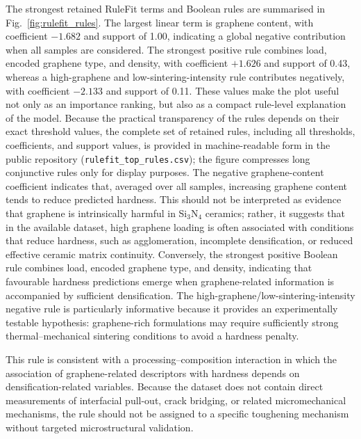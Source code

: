 \documentclass[pdflatex,sn-mathphys-num]{sn-jnl}%
\theoremstyle{thmstyleone}%
\theoremstyle{thmstyletwo}%
\theoremstyle{thmstylethree}%
\begin{document}
The strongest retained RuleFit terms and Boolean rules are summarised in Fig.~\ref{fig:rulefit_rules}. The largest linear term is graphene content, with coefficient $-1.682$ and support of 1.00, indicating a global negative contribution when all samples are considered. The strongest positive rule combines load, encoded graphene type, and density, with coefficient $+1.626$ and support of 0.43, whereas a high-graphene and low-sintering-intensity rule contributes negatively, with coefficient $-2.133$ and support of 0.11. These values make the plot useful not only as an importance ranking, but also as a compact rule-level explanation of the model. Because the practical transparency of the rules depends on their exact threshold values, the complete set of retained rules, including all thresholds, coefficients, and support values, is provided in machine-readable form in the public repository (\texttt{rulefit\_top\_rules.csv}); the figure compresses long conjunctive rules only for display purposes. The negative graphene-content coefficient indicates that, averaged over all samples, increasing graphene content tends to reduce predicted hardness. This should not be interpreted as evidence that graphene is intrinsically harmful in Si$_3$N$_4$ ceramics; rather, it suggests that in the available dataset, high graphene loading is often associated with conditions that reduce hardness, such as agglomeration, incomplete densification, or reduced effective ceramic matrix continuity. Conversely, the strongest positive Boolean rule combines load, encoded graphene type, and density, indicating that favourable hardness predictions emerge when graphene-related information is accompanied by sufficient densification. The high-graphene/low-sintering-intensity negative rule is particularly informative because it provides an experimentally testable hypothesis: graphene-rich formulations may require sufficiently strong thermal--mechanical sintering conditions to avoid a hardness penalty.

This rule is consistent with a processing--composition interaction in which the association of graphene-related descriptors with hardness depends on densification-related variables. Because the dataset does not contain direct measurements of interfacial pull-out, crack bridging, or related micromechanical mechanisms, the rule should not be assigned to a specific toughening mechanism without targeted microstructural validation.
\end{document}
